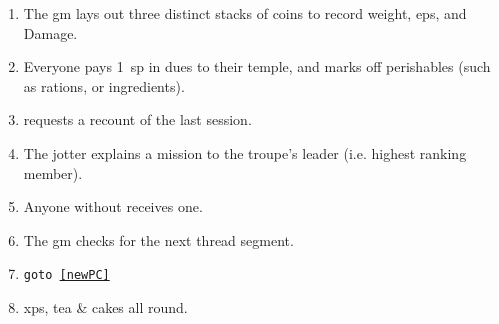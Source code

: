 
\begin{enumerate}
  \item
  The \gls{gm} lays out three distinct stacks of coins to record \gls{weight}, \glspl{ep}, and Damage.
  \item
  Everyone pays 1~\gls{sp} in dues to their temple, and marks off perishables (such as \glspl{ration}, or \glspl{ingredient}).
  \item
   requests a recount of the last session.
  \item
  The \gls{jotter} explains a mission to the troupe's leader (i.e. highest ranking member).
  \item
  Anyone without  receives one.
  \label{newPC}
  \item
  The \gls{gm} checks for the next \gls{thread} \gls{segment}.
  \item
  {\tt goto \ref{newPC}}
  \item
  \Glspl{xp}, tea \& cakes all round.
\end{enumerate}

